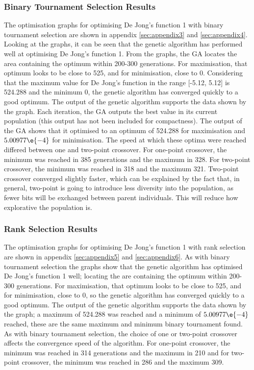 \subsubsection{Binary Tournament Selection Results}
The optimisation graphs for optimising De Jong's function 1 with binary tournament selection are shown in appendix \ref{sec:appendix3} and \ref{sec:appendix4}. Looking at the graphs, it can be seen that the genetic algorithm has performed well at optimising De Jong's function 1. From the graphs, the GA locates the area containing the optimum within 200-300 generations. For maximisation, that optimum looks to be close to 525, and for minimisation, close to 0. Considering that the maximum value for De Jong's function  in the range [-5.12, 5.12] is 524.288 and the minimum 0, the genetic algorithm has converged quickly to a good optimum. The output of the genetic algorithm supports the data shown by the graph. Each iteration, the GA outputs the best value in its current population (this output has not been included for compactness). The output of the GA shows that it optimised to an optimum of 524.288 for maximisation and $5.00977\e{-4}$ for minimisation. The speed at which these optima were reached differed between one and two-point crossover. For one-point crossover, the minimum was reached in 385 generations and the maximum in 328. For two-point crossover, the minimum was reached in 318 and the maximum 321. Two-point crossover converged slightly faster, which can be explained by the fact that, in general, two-point is going to introduce less diversity into the population, as fewer bits will be exchanged between parent individuals. This will reduce how explorative the population is.

\subsubsection{Rank Selection Results}
The optimisation graphs for optimising De Jong's function 1 with rank selection are shown in appendix \ref{sec:appendix5} and \ref{sec:appendix6}. As with binary tournament selection the graphs show that the genetic algorithm has optimised De Jong's function 1 well; locating the are containing the optimum within 200-300 generations. For maximisation, that optimum looks to be close to 525, and for minimisation, close to 0, so the genetic algorithm has converged quickly to a good optimum. The output of the genetic algorithm supports the data shown by the graph; a maximum of 524.288 was reached and a minimum of $5.00977\e{-4}$ reached, these are the same maximum and minimum binary tournament found. As with binary tournament selection, the choice of one or two-point crossover affects the convergence speed of the algorithm. For one-point crossover, the minimum was reached in 314 generations and the maximum in 210 and for two-point crossover, the minimum was reached in 286 and the maximum 309.

